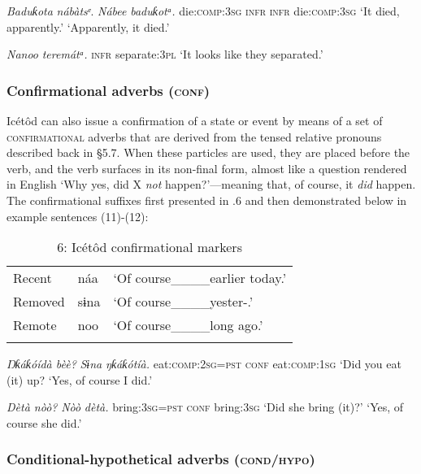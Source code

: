 \textit{Baduƙota}     \textit{nábàtsᵉ}.  \textit{Nábee}\textit{    baduƙotᵃ.}
die:\textsc{comp:3sg   infr}    \textsc{infr}     die:\textsc{comp:3sg}
‘It died, apparently.’    ‘Apparently, it died.’




\textit{Nanoo}\textit{   teremátᵃ.}
\textsc{infr}     separate:\textsc{3pl}
‘It looks like they separated.’




\subsubsection{Confirmational adverbs (\textsc{conf})}

Icétôd can also issue a confirmation of a state or event by means of a set of \textsc{confirmational} adverbs that are derived from the tensed relative pronouns described back in §5.7. When these particles are used, they are placed before the verb, and the verb surfaces in its non-final form, almost like a question rendered in English ‘Why yes, did X \textit{not} happen?’—meaning that, of course, it \textit{did} happen. The confirmational suffixes first presented in .6 and then demonstrated below in example sentences (11)-(12):


\begin{table}
\caption{6: Icétôd confirmational markers}
\label{tab:9}


\begin{tabularx}{\textwidth}{XXX}
\lsptoprule

Recent & náa & ‘Of course\_\_\_\_earlier today.’\\
Removed & sɨna & ‘Of course\_\_\_\_yester-.’\\
Remote & noo & ‘Of course\_\_\_\_long ago.’\\
\lspbottomrule
\end{tabularx}
\end{table}



\textit{Ŋ}\textit{ƙáƙóídà bèè?}    \textit{Sɨna}\textit{   ŋƙáƙótíà.}
eat:\textsc{comp:2sg=pst}    \textsc{conf}   eat\textsc{:comp:1sg}
‘Did you eat (it) up?  ‘Yes, of course I did.’




\textit{Dètà nòò?}      \textit{Nòò}\textit{   dètà.}
bring:\textsc{3sg=pst}    \textsc{conf}   bring:\textsc{3sg}
‘Did she bring (it)?’    ‘Yes, of course she did.’




\subsubsection{Conditional-hypothetical adverbs (\textsc{cond}/\textsc{hypo})}

